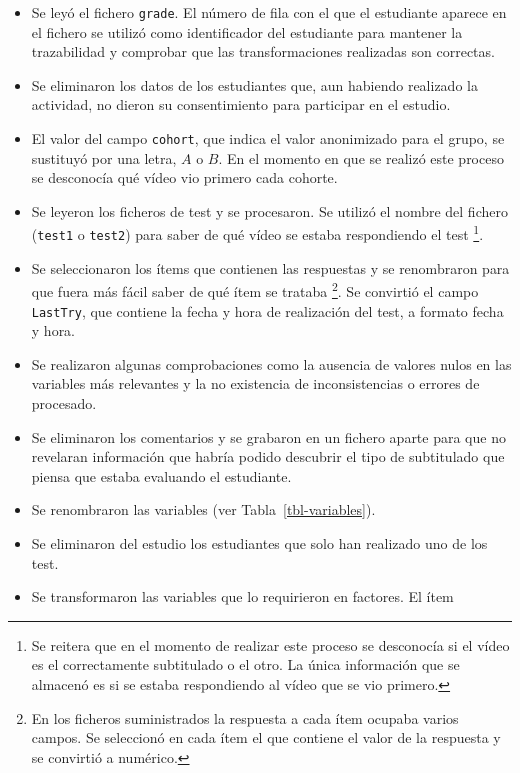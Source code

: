 \documentclass[
  12pt,
  a4paper,
  extrafontsizes,
  onecolumn,
  openright,
  table]{memoir}
\begin{document}
\begin{itemize}
\item
  Se leyó el fichero \texttt{grade}. El número de fila con el que el
  estudiante aparece en el fichero se utilizó como identificador del
  estudiante para mantener la trazabilidad y comprobar que las
  transformaciones realizadas son correctas.
\item
  Se eliminaron los datos de los estudiantes que, aun habiendo realizado
  la actividad, no dieron su consentimiento para participar en el
  estudio.
\item
  El valor del campo \texttt{cohort}, que indica el valor anonimizado
  para el grupo, se sustituyó por una letra, \(A\) o \(B\). En el
  momento en que se realizó este proceso se desconocía qué vídeo vio
  primero cada cohorte.
\item
  Se leyeron los ficheros de test y se procesaron. Se utilizó el nombre
  del fichero (\texttt{test1} o \texttt{test2}) para saber de qué vídeo
  se estaba respondiendo el test \footnote{Se reitera que en el momento
    de realizar este proceso se desconocía si el vídeo es el
    correctamente subtitulado o el otro. La única información que se
    almacenó es si se estaba respondiendo al vídeo que se vio primero.}.
\item
  Se seleccionaron los ítems que contienen las respuestas y se
  renombraron para que fuera más fácil saber de qué ítem se trataba
  \footnote{En los ficheros suministrados la respuesta a cada ítem
    ocupaba varios campos. Se seleccionó en cada ítem el que contiene el
    valor de la respuesta y se convirtió a numérico.}. Se convirtió el
  campo \texttt{LastTry}, que contiene la fecha y hora de realización
  del test, a formato fecha y hora.
\item
  Se realizaron algunas comprobaciones como la ausencia de valores nulos
  en las variables más relevantes y la no existencia de inconsistencias
  o errores de procesado.
\item
  Se eliminaron los comentarios y se grabaron en un fichero aparte para
  que no revelaran información que habría podido descubrir el tipo de
  subtitulado que piensa que estaba evaluando el estudiante.
\item
  Se renombraron las variables (ver Tabla~\ref{tbl-variables}).
\item
  Se eliminaron del estudio los estudiantes que solo han realizado uno
  de los test.
\item
  Se transformaron las variables que lo requirieron en factores. El ítem

\end{itemize}
\end{document}
